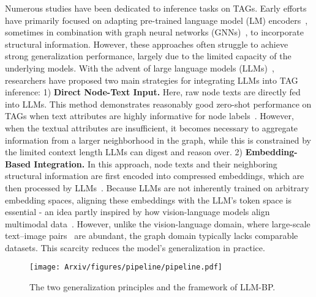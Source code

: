 Numerous studies have been dedicated to inference tasks on TAGs. Early efforts have primarily focused on adapting pre-trained language model (LM) encoders~\cite{li2024zerog, fang2024uniglm}, sometimes in combination with graph neural networks (GNNs)~\cite{hou2022graphmae, velivckovic2018deep}, to incorporate structural information. However, these approaches often struggle to achieve strong generalization performance, largely due to the limited capacity of the underlying models. With the advent of large language models (LLMs)~\cite{kaplan2020scaling,huang2022towards}, researchers have proposed two main strategies for integrating LLMs into TAG inference: 1) \textbf{Direct Node-Text Input.} Here, raw node texts are directly fed into LLMs. This method demonstrates reasonably good zero-shot performance on TAGs when text attributes are highly informative for node labels~\cite{chen2024exploring, li2024similarity}. However, when the textual attributes are insufficient, it becomes necessary to aggregate information from a larger neighborhood in the graph, while this is constrained by the limited context length LLMs can digest and reason over. 2) \textbf{Embedding-Based Integration.} In this approach, node texts and their neighboring structural information are first encoded into compressed embeddings, which are then processed by LLMs~\cite{chen2024llaga,tang2024graphgpt,luo2024enhance,wang2024llms,zhang2024graphtranslator}. Because LLMs are not inherently trained on arbitrary embedding spaces, aligning these embeddings with the LLM's token space is essential - an idea partly inspired by how vision-language models align multimodal data~\cite{radford2021learning, zhai2023sigmoid}. However, unlike the vision-language domain, where large-scale text–image pairs~\cite{schuhmann2022laion} are abundant, the graph domain typically lacks comparable datasets. This scarcity reduces the model’s generalization in practice.

\begin{figure*}[t]
    \centering
    \texttt{[image: Arxiv/figures/pipeline/pipeline.pdf]}
    \vspace{-0.2cm}
    \caption{The two generalization principles and the framework of LLM-BP.}
    \vspace{-0.4cm}
    \label{fig:pipe}
\end{figure*}



